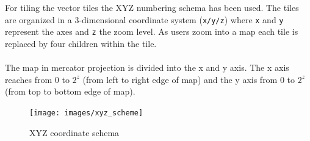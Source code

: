 \noindent\begin{minipage}[t]{0.48\linewidth}
    \vspace{0pt}
    For tiling the vector tiles the XYZ numbering schema has been used.
    The tiles are organized in a 3-dimensional coordinate system (\texttt{x/y/z}) where \texttt{x} and \texttt{y} represent the axes and \texttt{z} the zoom level. As users zoom into a map each tile is replaced by four children within the tile.\\\\
    The map in mercator projection is divided into the x and y axis. The x axis reaches from 0 to $2^z$ (from left to right edge of map) and the y axis from 0 to $2^z$ (from top to bottom edge of map).
\end{minipage}
\hfill
\begin{minipage}[t]{0.48\linewidth}
    \vspace{-10pt}
    \begin{figure}[H]
    \centering
    \texttt{[image: images/xyz\_scheme]}
    \caption{XYZ coordinate schema}
    \end{figure}
\end{minipage}

